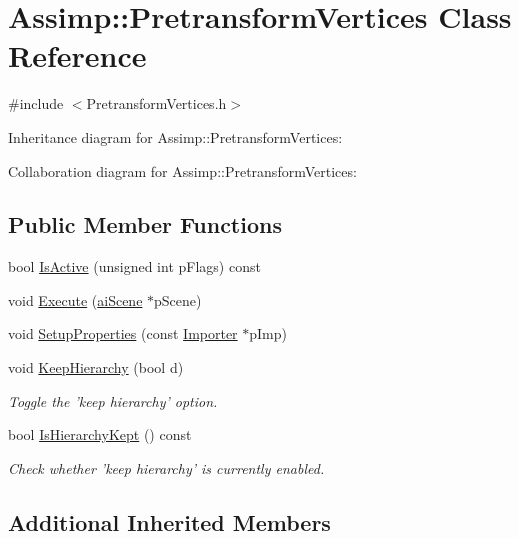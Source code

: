 \hypertarget{class_assimp_1_1_pretransform_vertices}{\section{Assimp\+:\+:Pretransform\+Vertices Class Reference}
\label{class_assimp_1_1_pretransform_vertices}
}


{\ttfamily \#include $<$Pretransform\+Vertices.\+h$>$}



Inheritance diagram for Assimp\+:\+:Pretransform\+Vertices\+:


Collaboration diagram for Assimp\+:\+:Pretransform\+Vertices\+:
\subsection*{Public Member Functions}
\begin{DoxyCompactItemize}
\item 
bool \hyperlink{class_assimp_1_1_pretransform_vertices_aa19f06a0ac7c56e2399d3228c931bf44}{Is\+Active} (unsigned int p\+Flags) const 
\item 
void \hyperlink{class_assimp_1_1_pretransform_vertices_abd60b44e5cf02f7bd2195f3e76f12c6d}{Execute} (\hyperlink{structai_scene}{ai\+Scene} $\ast$p\+Scene)
\item 
void \hyperlink{class_assimp_1_1_pretransform_vertices_a8ea23ed889731ad993d03c267c037490}{Setup\+Properties} (const \hyperlink{class_assimp_1_1_importer}{Importer} $\ast$p\+Imp)
\item 
void \hyperlink{class_assimp_1_1_pretransform_vertices_a63e75dddef3a1bbb27fb9c91be9a6d54}{Keep\+Hierarchy} (bool d)
\begin{DoxyCompactList}\small\item\em Toggle the 'keep hierarchy' option. \end{DoxyCompactList}\item 
bool \hyperlink{class_assimp_1_1_pretransform_vertices_acc7bbae42525dc8ee462c66b6785a0e5}{Is\+Hierarchy\+Kept} () const 
\begin{DoxyCompactList}\small\item\em Check whether 'keep hierarchy' is currently enabled. \end{DoxyCompactList}\end{DoxyCompactItemize}
\subsection*{Additional Inherited Members}


